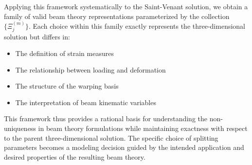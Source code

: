 
Applying this framework systematically to the Saint-Venant solution, we obtain a family of valid beam theory representations parameterized by the collection $\{\Xi_j^{(m)}\}$. 
Each choice within this family exactly represents the three-dimensional solution but differs in:
\begin{itemize}
\item The definition of strain measures
\item The relationship between loading and deformation
\item The structure of the warping basis
\item The interpretation of beam kinematic variables
\end{itemize}

This framework thus provides a rational basis for understanding the non-uniqueness in beam theory formulations while maintaining exactness with respect to the parent three-dimensional solution. The specific choice of splitting parameters becomes a modeling decision guided by the intended application and desired properties of the resulting beam theory.


